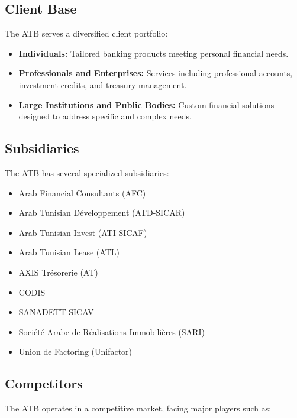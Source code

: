 \subsection{Client Base}

The ATB serves a diversified client portfolio:

\begin{itemize}
    \item \textbf{Individuals:} Tailored banking products meeting personal financial needs.
    \item \textbf{Professionals and Enterprises:} Services including professional accounts,
    investment credits, and treasury management.
    \item \textbf{Large Institutions and Public Bodies:} Custom financial solutions designed
    to address specific and complex needs.
\end{itemize}

\subsection{Subsidiaries}

The ATB has several specialized subsidiaries:

\begin{itemize}
    \item Arab Financial Consultants (AFC)
    \item Arab Tunisian D\'{e}veloppement (ATD-SICAR)
    \item Arab Tunisian Invest (ATI-SICAF)
    \item Arab Tunisian Lease (ATL)
    \item AXIS Tr\'{e}sorerie (AT)
    \item CODIS
    \item SANADETT SICAV
    \item Soci\'{e}t\'{e} Arabe de R\'{e}alisations Immobili\`{e}res (SARI)
    \item Union de Factoring (Unifactor)
\end{itemize}

\subsection{Competitors}

The ATB operates in a competitive market, facing major players such as:

